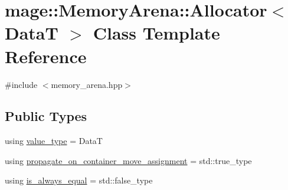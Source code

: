 \hypertarget{classmage_1_1_memory_arena_1_1_allocator}{}\section{mage\+:\+:Memory\+Arena\+:\+:Allocator$<$ DataT $>$ Class Template Reference}
\label{classmage_1_1_memory_arena_1_1_allocator}


{\ttfamily \#include $<$memory\+\_\+arena.\+hpp$>$}

\subsection*{Public Types}
\begin{DoxyCompactItemize}
\item 
using \mbox{\hyperlink{classmage_1_1_memory_arena_1_1_allocator_a6ae3ef840bd738889b2c4136294a4f6d}{value\+\_\+type}} = DataT
\item 
using \mbox{\hyperlink{classmage_1_1_memory_arena_1_1_allocator_adeee02145ab4a2eca5e38a70babd81e0}{propagate\+\_\+on\+\_\+container\+\_\+move\+\_\+assignment}} = std\+::true\+\_\+type
\item 
using \mbox{\hyperlink{classmage_1_1_memory_arena_1_1_allocator_aa03d66542fcf507199911bca8b270bfc}{is\+\_\+always\+\_\+equal}} = std\+::false\+\_\+type
\end{DoxyCompactItemize}
